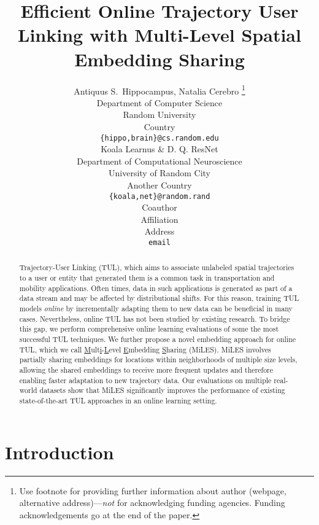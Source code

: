 \documentclass{article} %
\title{Efficient Online Trajectory User Linking with Multi-Level Spatial Embedding Sharing}
\author{Antiquus S.~Hippocampus, Natalia Cerebro  \thanks{ Use footnote for providing further information
about author (webpage, alternative address)---\emph{not} for acknowledging
funding agencies.  Funding acknowledgements go at the end of the paper.} \\
Department of Computer Science\\
Random University\\
Country \\
\texttt{\{hippo,brain\}@cs.random.edu} \\
\And %
Koala Learnus \& D. Q. ResNet  \\
Department of Computational Neuroscience \\
University of Random City \\
Another Country \\
\texttt{\{koala,net\}@random.rand} \\
\AND %
Coauthor \\
Affiliation \\
Address \\
\texttt{email}
}
\theoremstyle{definition}
\begin{document}
\maketitle

\begin{abstract}
    Trajectory-User Linking (TUL), which aims to associate unlabeled spatial trajectories to a user or entity that generated them is a common task in transportation and mobility applications.
    Often times, data in such applications is generated as part of a data stream and may be affected by distributional shifts.
    For this reason, training TUL models \textit{online} by incrementally adapting them to new data can be beneficial in many cases.
    Nevertheless, online TUL has not been studied by existing research.
    To bridge this gap, we perform comprehensive online learning evaluations of some the most successful TUL techniques.
    We further propose a novel embedding approach for online TUL, which we call \underline{M}ult\underline{i}-\underline{L}evel \underline{E}mbedding \underline{S}haring (MiLES).
    MiLES involves partially sharing embeddings for locations within neighborhoods of multiple size levels, allowing the shared embeddings to receive more frequent updates and therefore enabling faster adaptation to new trajectory data.
    Our evaluations on multiple real-world datasets show that MiLES significantly improves the performance of existing state-of-the-art TUL approaches in an online learning setting.
\end{abstract}

\section{Introduction}\label{sec:intro}
\end{document}
